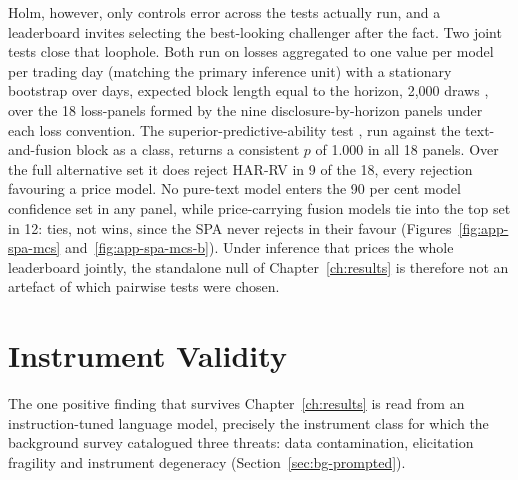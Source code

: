 Holm, however, only controls error across the tests actually run, and a leaderboard invites selecting the best-looking challenger after the fact. Two joint tests close that loophole. Both run on losses aggregated to one value per model per trading day (matching the primary inference unit) with a stationary bootstrap over days, expected block length equal to the horizon, 2{,}000 draws \cite{politis1994stationary}, over the 18 loss-panels formed by the nine disclosure-by-horizon panels under each loss convention. %
The superior-predictive-ability test \cite{hansen2005spa}, run against the text-and-fusion block as a class, returns a consistent $p$ of 1.000 in all 18 panels. Over the full alternative set it does reject HAR-RV in 9 of the 18, every rejection favouring a price model. %
No pure-text model enters the 90 per cent model confidence set \cite{hansen2011mcs} in any panel, while price-carrying fusion models tie into the top set in 12: ties, not wins, since the SPA never rejects in their favour (Figures~\ref{fig:app-spa-mcs} and~\ref{fig:app-spa-mcs-b}). %
Under inference that prices the whole leaderboard jointly, the standalone null of Chapter~\ref{ch:results} is therefore not an artefact of which pairwise tests were chosen.

\section{Instrument Validity}
\label{sec:val-instruments}

The one positive finding that survives Chapter~\ref{ch:results} is read from an instruction-tuned language model, precisely the instrument class for which the background survey catalogued three threats: data contamination, elicitation fragility and instrument degeneracy (Section~\ref{sec:bg-prompted}).

